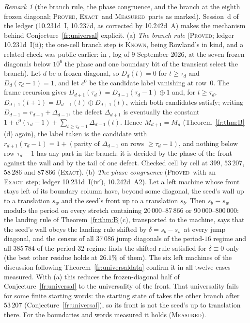 \documentclass[11pt]{article}
\theoremstyle{definition}
\theoremstyle{remark}
\newtheorem{remark}[theorem]{Remark}
\newcommand{\PROVED}{\textsc{Proved}}
\newcommand{\EXACT}{\textsc{Exact}}
\newcommand{\MEASURED}{\textsc{Measured}}
\newcommand{\KNOWN}{\textsc{Known}}
\begin{document}
\begin{remark}[the branch rule, the phase congruence, and the branch at the eighth frozen diagonal; \PROVED, \EXACT\ and \MEASURED\ parts as marked]\label{fr:branchrule}
Session~d of the ledger (10.231d~I, 10.237d, as corrected by 10.242d~A) makes the mechanism behind Conjecture~\ref{fr:universal} explicit.
(a) \emph{The branch rule} (\PROVED; ledger 10.231d~I(ii); the one-cell branch step is \KNOWN, being Rowland's \cite[Lemma~3]{Rowland} in kind, and a related check was public earlier: in \cite{Pat}, log of 9 September 2026, at the seven frozen diagonals below $10^{6}$ the phase and one boundary bit of the transient select the branch). Let $d$ be a frozen diagonal, so $D_d(t)=0$ for $t\ge\tau_d$ and $D_d(\tau_d-1)=1$, and let $c^{0}$ be the candidate label vanishing at row~$0$. The frame recursion gives $D_{d+1}(\tau_d)=D_{d-1}(\tau_d-1)\oplus1$ and, for $t\ge\tau_d$, $D_{d+1}(t+1)=D_{d-1}(t)\oplus D_{d+1}(t)$, which both candidates satisfy; writing $D_{d-1}=r_{d-1}+\Delta_{d-1}$, the defect $\Delta_{d+1}$ is eventually the constant $1+c^{0}(\tau_d-1)+\sum_{t\ge\tau_d-1}\Delta_{d-1}(t)$. Hence $M_{d+1}=M_d$ (Theorem~\ref{fr:thm:B}(d) again), the label taken is the candidate with $r_{d+1}(\tau_d-1)=1+(\text{parity of }\Delta_{d-1}\text{ on rows }\ge\tau_d-1)$, and nothing below row $\tau_d-1$ has any part in the branch: it is decided by the phase of the front against the wall and by the tail of one defect. Checked cell by cell at $399$, $53\,207$, $58\,286$ and $87\,866$ (\EXACT).
(b) \emph{The phase congruence} (\PROVED\ with an \EXACT\ step; ledger 10.231d~I(iv$'$), 10.242d~A2). Let a left machine whose front stays left of its boundary column have, beyond some diagonal, the seed's wall up to a translation $s_w$ and the seed's front up to a translation $s_b$. Then $s_b\equiv s_w$ modulo the period on every stretch containing $20\,000$--$87\,866$ or $90\,000$--$800\,000$: the landing rule of Theorem~\ref{fr:thm:B}(c), transported to the machine, says that the seed's wall obeys the landing rule shifted by $\delta=s_b-s_w$ at every jump diagonal, and the census of all $37\,086$ jump diagonals of the period-$16$ regime and all $385\,784$ of the period-$32$ regime finds the shifted rule satisfied for $\delta\equiv0$ only (the best other residue holds at $26.1\%$ of them). The six left machines of the discussion following Theorem~\ref{fr:universaldata} confirm it in all twelve cases measured. With (a) this reduces the frozen-diagonal half of Conjecture~\ref{fr:universal} to the universality of the front. That universality fails for some finite starting words: the starting state of \cite{Lania} takes the other branch after $53\,207$ (Conjecture~\ref{fr:universal}), so its front is not the seed's up to translation there. For the boundaries and words measured it holds (\MEASURED).

\end{remark}
\end{document}
